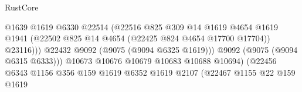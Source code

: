\begin{lexlean}{RustCore}
\begin{coremodule}
                                                        @1639
                                                        @1619
                                                        @6330
                                                        @22514
                                                        (@22516
                                                          @825
                                                          @309
                                                          @14
                                                          @1619
                                                          @4654
                                                          @1619
                                                          @1941
                                                          (@22502
                                                            @825
                                                            @14
                                                            @4654
                                                            (@22425 @824 @4654 @17700 @17704))
                                                          @23116)))
                                                    @22432
                                                    @9092
                                                    (@9075 (@9094 @6325 @1619)))
                                                  @9092
                                                  (@9075 (@9094 @6315 @6333)))
                                                @10673
                                                @10676
                                                @10679
                                                @10683
                                                @10688
                                                @10694)
                                              (@22456
                                                @6343
                                                @1156
                                                @356
                                                @159
                                                @1619
                                                @6352
                                                @1619
                                                @2107
                                                (@22467
                                                  @1155
                                                  @22
                                                  @159
                                                  @1619

\end{coremodule}
\end{lexlean}
